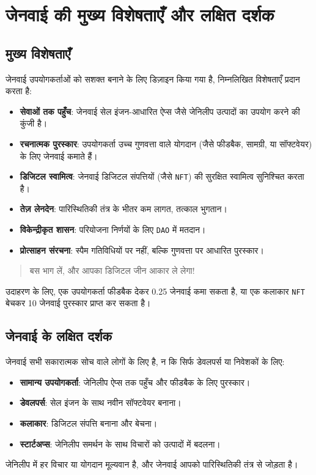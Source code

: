 \documentclass[a4paper,12pt,openany]{book}
\begin{document}
\section*{जेनवाई की मुख्य विशेषताएँ और लक्षित दर्शक}
\subsection*{मुख्य विशेषताएँ}
जेनवाई उपयोगकर्ताओं को सशक्त बनाने के लिए डिज़ाइन किया गया है, निम्नलिखित विशेषताएँ प्रदान करता है:
\begin{itemize}
    \item \textbf{सेवाओं तक पहुँच}: जेनवाई सेल इंजन-आधारित ऐप्स जैसे जेनिलीप उत्पादों का उपयोग करने की कुंजी है।
    \item \textbf{रचनात्मक पुरस्कार}: उपयोगकर्ता उच्च गुणवत्ता वाले योगदान (जैसे फीडबैक, सामग्री, या सॉफ्टवेयर) के लिए जेनवाई कमाते हैं।
    \item \textbf{डिजिटल स्वामित्व}: जेनवाई डिजिटल संपत्तियों (जैसे \texttt{NFT}) की सुरक्षित स्वामित्व सुनिश्चित करता है।
    \item \textbf{तेज़ लेनदेन}: पारिस्थितिकी तंत्र के भीतर कम लागत, तत्काल भुगतान।
    \item \textbf{विकेन्द्रीकृत शासन}: परियोजना निर्णयों के लिए \texttt{DAO} में मतदान।
    \item \textbf{प्रोत्साहन संरचना}: स्पैम गतिविधियों पर नहीं, बल्कि गुणवत्ता पर आधारित पुरस्कार।
\end{itemize}
\begin{quote}
बस भाग लें, और आपका डिजिटल जीन आकार ले लेगा!
\end{quote}
उदाहरण के लिए, एक उपयोगकर्ता फीडबैक देकर 0.25 जेनवाई कमा सकता है, या एक कलाकार \texttt{NFT} बेचकर 10 जेनवाई पुरस्कार प्राप्त कर सकता है।

\subsection*{जेनवाई के लक्षित दर्शक}
जेनवाई सभी सकारात्मक सोच वाले लोगों के लिए है, न कि सिर्फ डेवलपर्स या निवेशकों के लिए:
\begin{itemize}
    \item \textbf{सामान्य उपयोगकर्ता}: जेनिलीप ऐप्स तक पहुँच और फीडबैक के लिए पुरस्कार।
    \item \textbf{डेवलपर्स}: सेल इंजन के साथ नवीन सॉफ्टवेयर बनाना।
    \item \textbf{कलाकार}: डिजिटल संपत्ति बनाना और बेचना।
    \item \textbf{स्टार्टअप्स}: जेनिलीप समर्थन के साथ विचारों को उत्पादों में बदलना।
\end{itemize}
जेनिलीप में हर विचार या योगदान मूल्यवान है, और जेनवाई आपको पारिस्थितिकी तंत्र से जोड़ता है।
\newpage
\end{document}
